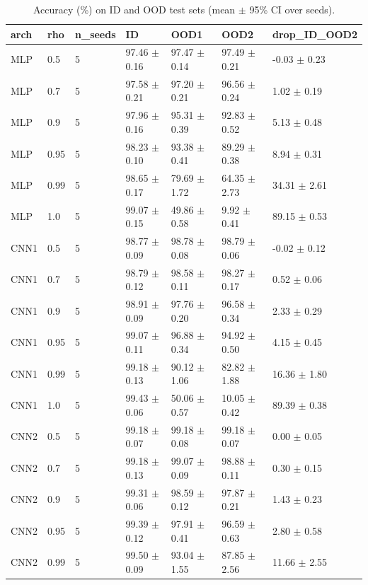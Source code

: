\begin{table}[t]
\centering
\small
\caption{Accuracy (\%) on ID and OOD test sets (mean $\pm$ 95\% CI over seeds).}
\label{tab:main}
\begin{tabular}{lllllll}
\toprule
arch & rho & n\_seeds & ID & OOD1 & OOD2 & drop\_ID\_OOD2 \\
\midrule
MLP & 0.5 & 5 & 97.46 $\pm$ 0.16 & 97.47 $\pm$ 0.14 & 97.49 $\pm$ 0.21 & -0.03 $\pm$ 0.23 \\
MLP & 0.7 & 5 & 97.58 $\pm$ 0.21 & 97.20 $\pm$ 0.21 & 96.56 $\pm$ 0.24 & 1.02 $\pm$ 0.19 \\
MLP & 0.9 & 5 & 97.96 $\pm$ 0.16 & 95.31 $\pm$ 0.39 & 92.83 $\pm$ 0.52 & 5.13 $\pm$ 0.48 \\
MLP & 0.95 & 5 & 98.23 $\pm$ 0.10 & 93.38 $\pm$ 0.41 & 89.29 $\pm$ 0.38 & 8.94 $\pm$ 0.31 \\
MLP & 0.99 & 5 & 98.65 $\pm$ 0.17 & 79.69 $\pm$ 1.72 & 64.35 $\pm$ 2.73 & 34.31 $\pm$ 2.61 \\
MLP & 1.0 & 5 & 99.07 $\pm$ 0.15 & 49.86 $\pm$ 0.58 & 9.92 $\pm$ 0.41 & 89.15 $\pm$ 0.53 \\
CNN1 & 0.5 & 5 & 98.77 $\pm$ 0.09 & 98.78 $\pm$ 0.08 & 98.79 $\pm$ 0.06 & -0.02 $\pm$ 0.12 \\
CNN1 & 0.7 & 5 & 98.79 $\pm$ 0.12 & 98.58 $\pm$ 0.11 & 98.27 $\pm$ 0.17 & 0.52 $\pm$ 0.06 \\
CNN1 & 0.9 & 5 & 98.91 $\pm$ 0.09 & 97.76 $\pm$ 0.20 & 96.58 $\pm$ 0.34 & 2.33 $\pm$ 0.29 \\
CNN1 & 0.95 & 5 & 99.07 $\pm$ 0.11 & 96.88 $\pm$ 0.34 & 94.92 $\pm$ 0.50 & 4.15 $\pm$ 0.45 \\
CNN1 & 0.99 & 5 & 99.18 $\pm$ 0.13 & 90.12 $\pm$ 1.06 & 82.82 $\pm$ 1.88 & 16.36 $\pm$ 1.80 \\
CNN1 & 1.0 & 5 & 99.43 $\pm$ 0.06 & 50.06 $\pm$ 0.57 & 10.05 $\pm$ 0.42 & 89.39 $\pm$ 0.38 \\
CNN2 & 0.5 & 5 & 99.18 $\pm$ 0.07 & 99.18 $\pm$ 0.08 & 99.18 $\pm$ 0.07 & 0.00 $\pm$ 0.05 \\
CNN2 & 0.7 & 5 & 99.18 $\pm$ 0.13 & 99.07 $\pm$ 0.09 & 98.88 $\pm$ 0.11 & 0.30 $\pm$ 0.15 \\
CNN2 & 0.9 & 5 & 99.31 $\pm$ 0.06 & 98.59 $\pm$ 0.12 & 97.87 $\pm$ 0.21 & 1.43 $\pm$ 0.23 \\
CNN2 & 0.95 & 5 & 99.39 $\pm$ 0.12 & 97.91 $\pm$ 0.41 & 96.59 $\pm$ 0.63 & 2.80 $\pm$ 0.58 \\
CNN2 & 0.99 & 5 & 99.50 $\pm$ 0.09 & 93.04 $\pm$ 1.55 & 87.85 $\pm$ 2.56 & 11.66 $\pm$ 2.55 \\

\end{tabular}
\end{table}
